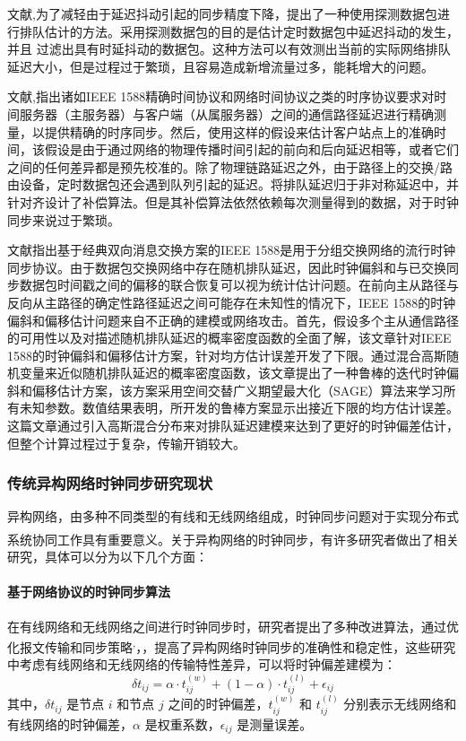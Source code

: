 \documentclass[UTF8,a4paper,12pt]{ctexart}
\numberwithin{equation}{section}
\begin{document}
文献\cite{simanic2011compensation},\cite{lee2011accuracy}为了减轻由于延迟抖动引起的同步精度下降，提出了一种使用探测数据包进行排队估计的方法。采用探测数据包的目的是估计定时数据包中延迟抖动的发生，并且 过滤出具有时延抖动的数据包。这种方法可以有效测出当前的实际网络排队延迟大小，但是过程过于繁琐，且容易造成新增流量过多，能耗增大的问题。


文献\cite{chaloupka2013efficient},\cite{karthik2019optimum}指出诸如IEEE 1588精确时间协议和网络时间协议之类的时序协议要求对时间服务器（主服务器）与客户端（从属服务器）之间的通信路径延迟进行精确测量，以提供精确的时序同步。然后，使用这样的假设来估计客户站点上的准确时间，该假设是由于通过网络的物理传播时间引起的前向和后向延迟相等，或者它们之间的任何差异都是预先校准的。除了物理链路延迟之外，由于路径上的交换/路由设备，定时数据包还会遇到队列引起的延迟。将排队延迟归于非对称延迟中，并针对齐设计了补偿算法。但是其补偿算法依然依赖每次测量得到的数据，对于时钟同步来说过于繁琐。


文献\cite{karthik2020robust}指出基于经典双向消息交换方案的IEEE 1588是用于分组交换网络的流行时钟同步协议。由于数据包交换网络中存在随机排队延迟，因此时钟偏斜和与已交换同步数据包时间戳之间的偏移的联合恢复可以视为统计估计问题。在前向主从路径与反向从主路径的确定性路径延迟之间可能存在未知性的情况下，IEEE 1588的时钟偏斜和偏移估计问题来自不正确的建模或网络攻击。首先，假设多个主从通信路径的可用性以及对描述随机排队延迟的概率密度函数的全面了解，该文章针对IEEE 1588的时钟偏斜和偏移估计方案，针对均方估计误差开发了下限。通过混合高斯随机变量来近似随机排队延迟的概率密度函数，该文章提出了一种鲁棒的迭代时钟偏斜和偏移估计方案，该方案采用空间交替广义期望最大化（SAGE）算法来学习所有未知参数。数值结果表明，所开发的鲁棒方案显示出接近下限的均方估计误差。这篇文章通过引入高斯混合分布来对排队延迟建模来达到了更好的时钟偏差估计，但整个计算过程过于复杂，传输开销较大。
\subsubsection{传统异构网络时钟同步研究现状}
异构网络，由多种不同类型的有线和无线网络组成，时钟同步问题对于实现分布式系统协同工作具有重要意义\textsuperscript{\textsuperscript{\cite{lopez2012mobility}}}。关于异构网络的时钟同步，有许多研究者做出了相关研究，具体可以分为以下几个方面：
\paragraph{基于网络协议的时钟同步算法}
在有线网络和无线网络之间进行时钟同步时，研究者提出了多种改进算法，通过优化报文传输和同步策略\textsuperscript{\cite{kazaz2018joint},\cite{gu2021energy}}，，提高了异构网络时钟同步的准确性和稳定性，这些研究中考虑有线网络和无线网络的传输特性差异，可以将时钟偏差建模为：
\begin{equation}
	\delta t_{ij} = \alpha \cdot t_{ij}^{(w)} + (1 - \alpha) \cdot t_{ij}^{(l)} + \epsilon_{ij}
\end{equation}
其中，$\delta t_{ij}$ 是节点 $i$ 和节点 $j$ 之间的时钟偏差，$t_{ij}^{(w)}$ 和 $t_{ij}^{(l)}$ 分别表示无线网络和有线网络的时钟偏差，$\alpha$ 是权重系数，$\epsilon_{ij}$ 是测量误差。
\end{document}
